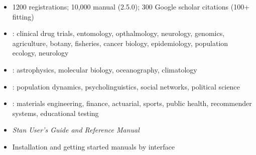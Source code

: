 \documentclass[10pt]{report}
\begin{document}
\begin{itemize}
\item 1200  registrations;  10,000 manual
   (2.5.0); 300 Google scholar citations (100+ fitting)
\item {}: {\footnotesize
clinical drug trials, entomology, opthalmology,
neurology, genomics, agriculture, botany, fisheries,
cancer biology, epidemiology, population ecology, neurology
}
\item {}: {\footnotesize 
astrophysics, molecular biology, oceanography, climatology
}
\item {}: {\footnotesize
 population dynamics, psycholinguistics, social networks, political science
}
\item {}: {\footnotesize materials engineering, finance, actuarial,
  sports, public health, recommender systems, educational testing}
\end{itemize}

% 
\begin{itemize}
\item {\slshape Stan User's Guide and Reference Manual}
\item Installation and getting started manuals by interface
\end{itemize}
\end{document}
